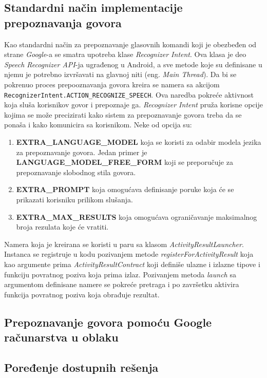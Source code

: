 \documentclass[struktura.tex]{subfiles}
\begin{document}
\subsection{Standardni način implementacije prepoznavanja govora}
Kao standardni način za prepoznavanje glasovnih komandi koji je obezbeđen od strane \textit{Google}-a se smatra upotreba klase \textit{Recognizer Intent}. Ova klasa je deo \textit{Speech Recognizer API}-ja ugrađenog u Android, a sve metode koje su definisane u njemu je potrebno izvršavati na glavnoj niti (eng. \textit{Main Thread}). Da bi se pokrenuo proces prepooznavanja govora kreira se namera sa akcijom \verb|RecognizerIntent.ACTION_RECOGNIZE_SPEECH|. Ova naredba pokreće aktivnost koja sluša korisnikov govor i prepoznaje ga. \textit{Recognizer Intent} pruža korisne opcije kojima se može precizirati kako sistem za prepoznavanje govora treba da se ponaša i kako komunicira sa korisnikom. Neke od opcija su:
\begin{enumerate}
    \item \textbf{EXTRA\_LANGUAGE\_MODEL} koja se koristi za odabir modela jezika za prepoznavanje govora. Jedan primer je \textbf{LANGUAGE\_MODEL\_FREE\_FORM} koji se preporučuje za prepoznavanje slobodnog stila govora.
    \item \textbf{EXTRA\_PROMPT} koja omogućava definisanje poruke koja će se prikazati korisniku prilikom slušanja.
    \item \textbf{EXTRA\_MAX\_RESULTS} koja omogućava ograničavanje maksimalnog broja rezulata koje će vratiti.
\end{enumerate}

Namera koja je kreirana se koristi u paru sa klasom \textit{ActivityResultLauncher}. Instanca se registruje u kodu pozivanjem metode \textit{registerForActivityResult} koja kao argumente prima \textit{ActivityResultContract} koji definiše ulazne i izlazne tipove i funkciju povratnog poziva koja prima izlaz. Pozivanjem metoda \textit{launch} sa argumentom definisane namere se pokreće pretraga i po završetku aktivira funkcija povratnog poziva koja obrađuje rezultat.

\subsection{Prepoznavanje govora pomoću Google računarstva u oblaku}


\subsection{Poređenje dostupnih rešenja}
\end{document}

